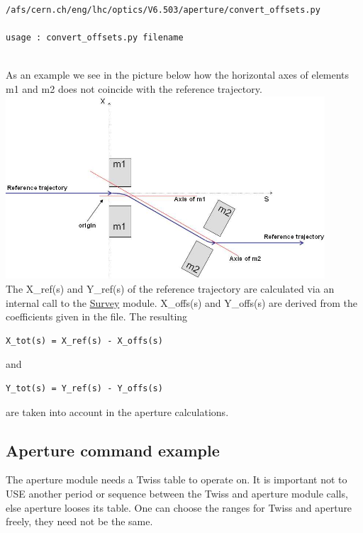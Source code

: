 \begin{itemize}
\begin{verbatim}
/afs/cern.ch/eng/lhc/optics/V6.503/aperture/convert_offsets.py

usage : convert_offsets.py filename


\end{verbatim} %
As an example we see in the picture below how the horizontal axes of elements m1 and m2 does not coincide with the reference trajectory. 
\\
\includegraphics[width=450px]{Introduction/offsetelem.jpg}%
\\ The X\_ref(s) and Y\_ref(s) of the reference trajectory are calculated via an internal call to the \href{../survey/survey.html}{Survey} module. X\_offs(s) and Y\_offs(s) are derived from the coefficients given in the file. The resulting 
\begin{verbatim}
X_tot(s) = X_ref(s) - X_offs(s)\end{verbatim} and 
\begin{verbatim}
Y_tot(s) = Y_ref(s) - Y_offs(s)\end{verbatim} are taken into account in the aperture calculations.  


\subsection{Aperture command example}

 The aperture module needs a Twiss table to operate on. It is important  not to USE another period or sequence between the Twiss and aperture  module calls, else aperture looses its table. One can choose the ranges  for Twiss and aperture freely, they need not be the same. 



\end{itemize}
